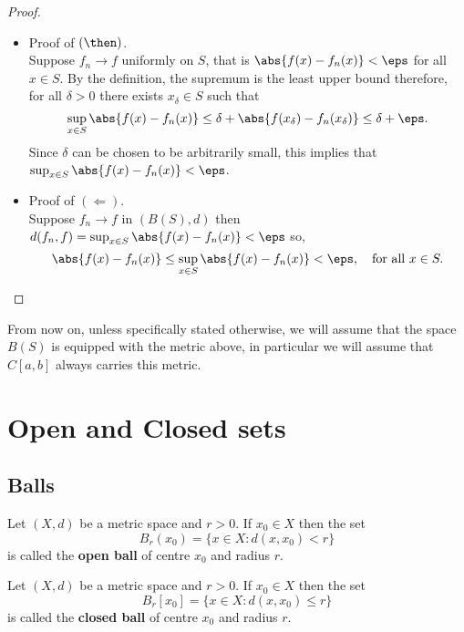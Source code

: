 \documentclass[12pt, a4paper]{article}
\begin{document}
\begin{proof}
    \hphantom{yeah}
    \begin{itemize}
        \item Proof of \((\then)\).  \\
        Suppose \(f_n \to f\) uniformly on \(S\), that is \(\abs{f(x)-f_n(x)} <\eps\) for all \(x \in S\). By the definition, the supremum is the least upper bound therefore, for all \(\delta>0\) there exists \(x_{\delta} \in S\) such that 
        \[\sup_{x\in S} \abs{f(x)-f_n(x)} \leq \delta + \abs{f(x_{\delta})-f_n(x_{\delta})} \leq \delta+\eps.\]
        Since \(\delta\) can be chosen to be arbitrarily small, this implies that \(\sup_{x\in S} \abs{f(x)-f_n(x)} <\eps\).
        \item Proof of \((\Leftarrow)\). \\
        Suppose \(f_n \to f\) in \((B(S),d)\) then \(d(f_n,f) = \sup_{x\in S} \abs{f(x)-f_n(x)} < \eps\) so,
        \[\abs{f(x)-f_n(x)} \leq \sup_{x\in S} \abs{f(x)-f_n(x)} < \eps, \quad \text{for all } x\in S.\]
    \end{itemize}
\end{proof}

From now on, unless specifically stated otherwise, we will assume that the space \(B(S)\) is equipped with the metric above, in particular we will assume that \(C[a,b]\) always carries this metric.

\section{Open and Closed sets}

\subsection{Balls}

\begin{definition}
    Let \((X,d)\) be a metric space and \(r>0\). If \(x_0 \in X\) then the set 
    \[B_r(x_0) = \{x \in X : d(x,x_0)<r\}\]
    is called the \textbf{open ball} of centre \(x_0\) and radius \(r\).
\end{definition}

\begin{definition}
    Let \((X,d)\) be a metric space and \(r>0\). If \(x_0 \in X\) then the set 
    \[B_r[x_0] = \{x \in X : d(x,x_0) \leq r\}\]
    is called the \textbf{closed ball} of centre \(x_0\) and radius \(r\).
\end{definition}
\end{document}
